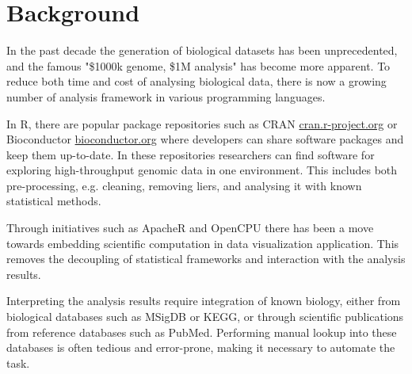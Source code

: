 
\section*{Background}
In the past decade the generation of biological datasets has been unprecedented,
and the famous "\$1000k genome, \$1M analysis"\cite{} has become more apparent.
To reduce both time and cost of analysing biological data, there is now a
growing number of analysis framework in various programming languages.\cite{}


In R, there are popular package repositories such as CRAN
\url{cran.r-project.org} or Bioconductor \url{bioconductor.org} where developers
can share software packages and keep them up-to-date. 
In these repositories
researchers can find software for exploring high-throughput genomic data in one
environment. This includes both pre-processing, e.g. cleaning, removing
liers, and analysing it with known statistical methods. 

Through initiatives such as ApacheR and OpenCPU there has been a move towards
embedding scientific computation in data visualization application. This removes
the decoupling of statistical frameworks and interaction with the analysis
results. 

Interpreting the analysis results require integration of known biology, either
from biological databases such as MSigDB\cite{} or KEGG\cite{}, or through
scientific publications from reference databases such as PubMed\cite{}.
Performing manual lookup into these databases is often tedious and error-prone,
making it necessary to automate the task. 

